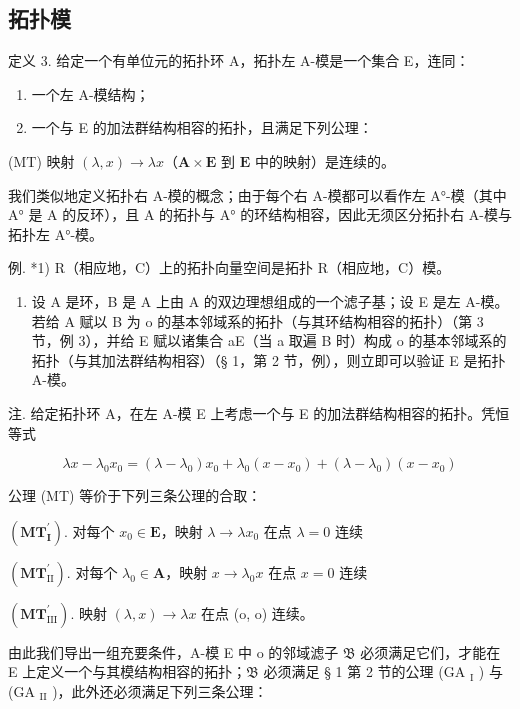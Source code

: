 \subsection{拓扑模}

定义 3. 给定一个有单位元的拓扑环 A，拓扑左 A-模是一个集合 E，连同：

\begin{enumerate}
\def\labelenumi{\arabic{enumi})}
\item
  一个左 A-模结构；
\item
  一个与 E 的加法群结构相容的拓扑，且满足下列公理：
\end{enumerate}

(MT) 映射 \((\lambda, x) \to \lambda x\)（\(\mathbf{A} \times \mathbf{E}\) 到 \(\mathbf{E}\) 中的映射）是连续的。

我们类似地定义拓扑右 A-模的概念；由于每个右 A-模都可以看作左 A°-模（其中 A° 是 A 的反环），且 A 的拓扑与 A° 的环结构相容，因此无须区分拓扑右 A-模与拓扑左 A°-模。

例. *1) R（相应地，C）上的拓扑向量空间是拓扑 R（相应地，C）模。

\begin{enumerate}
\def\labelenumi{\arabic{enumi})}
\setcounter{enumi}{1}
\tightlist
\item
  设 A 是环，B 是 A 上由 A 的双边理想组成的一个滤子基；设 E 是左 A-模。若给 A 赋以 B 为 o 的基本邻域系的拓扑（与其环结构相容的拓扑）（第 3 节，例 3），并给 E 赋以诸集合 aE（当 a 取遍 B 时）构成 o 的基本邻域系的拓扑（与其加法群结构相容）（§ 1，第 2 节，例），则立即可以验证 E 是拓扑 A-模。
\end{enumerate}

注. 给定拓扑环 A，在左 A-模 E 上考虑一个与 E 的加法群结构相容的拓扑。凭恒等式

\[
\lambda x - \lambda_ {0} x _ {0} = (\lambda - \lambda_ {0}) x _ {0} + \lambda_ {0} (x - x _ {0}) + (\lambda - \lambda_ {0}) (x - x _ {0})
\]

公理 (MT) 等价于下列三条公理的合取：

\((\mathbf{MT}_{\mathbf{I}}^{\prime})\). 对每个 \(x_0\in \mathbf{E}\)，映射 \(\lambda \to \lambda x_0\) 在点 \(\lambda = 0\) 连续

\((\mathbf{MT}_{\mathrm{II}}^{\prime})\). 对每个 \(\lambda_0\in \mathbf{A}\)，映射 \(x\to \lambda_0x\) 在点 \(x = 0\) 连续

\((\mathbf{MT}_{\mathrm{III}}^{\prime})\). 映射 \((\lambda ,x)\to \lambda x\) 在点 (o, o) 连续。

由此我们导出一组充要条件，A-模 E 中 o 的邻域滤子 \(\mathfrak{B}\) 必须满足它们，才能在 E 上定义一个与其模结构相容的拓扑；\(\mathfrak{B}\) 必须满足 § 1 第 2 节的公理 (GA \(_{\mathrm{I}}\) ) 与 (GA \(_{\mathrm{II}}\) )，此外还必须满足下列三条公理：

